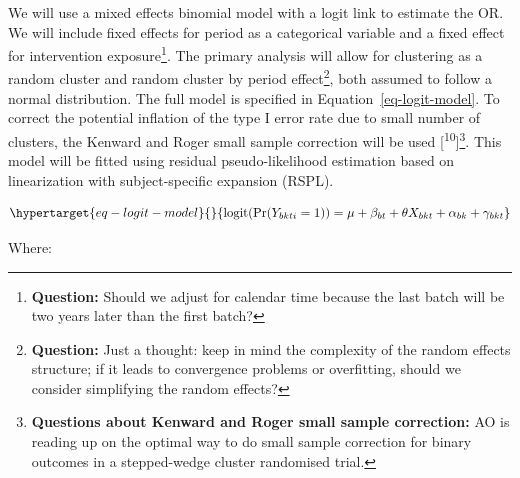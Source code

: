 \documentclass[
]{scrartcl}
\begin{document}
We will use a mixed effects binomial model with a logit link to estimate
the OR. We will include fixed effects for period as a categorical
variable and a fixed effect for intervention exposure\footnote{\textbf{Question:}
  Should we adjust for calendar time because the last batch will be two
  years later than the first batch?}. The primary analysis will allow
for clustering as a random cluster and random cluster by period
effect\footnote{\textbf{Question:} Just a thought: keep in mind the
  complexity of the random effects structure; if it leads to convergence
  problems or overfitting, should we consider simplifying the random
  effects?}, both assumed to follow a normal distribution. The full
model is specified in Equation~\ref{eq-logit-model}. To correct the
potential inflation of the type I error rate due to small number of
clusters, the Kenward and Roger small sample correction will be used
{[}\textsuperscript{10}{]}\footnote{\textbf{Questions about Kenward and
  Roger small sample correction:} AO is reading up on the optimal way to
  do small sample correction for binary outcomes in a stepped-wedge
  cluster randomised trial.}. This model will be fitted using residual
pseudo-likelihood estimation based on linearization with
subject-specific expansion (RSPL).

\begin{equation}\protect\hypertarget{eq-logit-model}{}{
\text{logit}(\text{Pr}(Y_{bkti} = 1)) = \mu + \beta_{bt} + \theta X_{bkt} + \alpha_{bk} + \gamma_{bkt} 
}\label{eq-logit-model}\end{equation}

Where:
\end{document}
